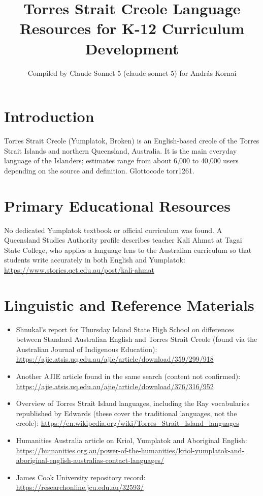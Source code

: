 \documentclass[12pt]{article}
\title{Torres Strait Creole Language Resources for K-12 Curriculum Development}
\author{Compiled by Claude Sonnet 5 (claude-sonnet-5) for Andr\'as Kornai}
\date{}
\begin{document}
\maketitle
\section{Introduction}
Torres Strait Creole (Yumplatok, Broken) is an English-based creole of the Torres Strait Islands and northern Queensland, Australia. It is the main everyday language of the Islanders; estimates range from about 6,000 to 40,000 users depending on the source and definition. Glottocode torr1261.
\section{Primary Educational Resources}
No dedicated Yumplatok textbook or official curriculum was found. A Queensland Studies Authority profile describes teacher Kali Ahmat at Tagai State College, who applies a language lens to the Australian curriculum so that students write accurately in both English and Yumplatok: \url{https://www.stories.qct.edu.au/post/kali-ahmat}
\section{Linguistic and Reference Materials}
\begin{itemize}
\item Shnukal's report for Thursday Island State High School on differences between Standard Australian English and Torres Strait Creole (found via the Australian Journal of Indigenous Education): \url{https://ajie.atsis.uq.edu.au/ajie/article/download/359/299/918}
\item Another AJIE article found in the same search (content not confirmed): \url{https://ajie.atsis.uq.edu.au/ajie/article/download/376/316/952}
\item Overview of Torres Strait Island languages, including the Ray vocabularies republished by Edwards (these cover the traditional languages, not the creole): \url{https://en.wikipedia.org/wiki/Torres_Strait_Island_languages}
\item Humanities Australia article on Kriol, Yumplatok and Aboriginal English: \url{https://humanities.org.au/power-of-the-humanities/kriol-yumplatok-and-aboriginal-english-australias-contact-languages/}
\item James Cook University repository record: \url{https://researchonline.jcu.edu.au/32593/}
\end{itemize}
\end{document}
